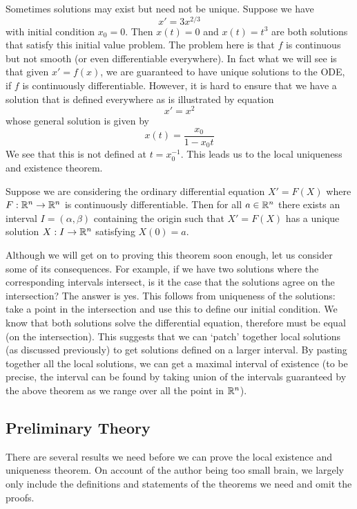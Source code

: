Sometimes solutions may exist but need not be unique. Suppose we have
$$x' = 3x^{2/3}$$
with initial condition $x_0 = 0$. Then $x(t) = 0$ and $x(t) = t^3$ are both solutions that satisfy this initial value problem. The problem here is that $f$ is continuous but not smooth (or even differentiable everywhere). In fact what we will see is that given $x' = f(x)$, we are guaranteed to have unique solutions to the ODE, if $f$ is continuously differentiable. However, it is hard to ensure that we have a solution that is defined everywhere as is illustrated by equation
$$x' = x^2$$
whose general solution is given by
$$x(t) = \frac{x_0}{1 - x_0 t}$$
We see that this is not defined at $t = x_0^{-1}$. This leads us to the local uniqueness and existence theorem.

\begin{theorem}
    Suppose we are considering the ordinary differential equation $X' = F(X)$ where $F: \mathbb{R}^n \to \mathbb{R}^n$ is continuously differentiable. Then for all $a \in \mathbb{R}^n$ there exists an interval $I = (\alpha, \beta)$ containing the origin such that $X' = F(X)$ has a unique solution $X: I \to \mathbb{R}^n$ satisfying $X(0) = a$.
\end{theorem}

Although we will get on to proving this theorem soon enough, let us consider some of its consequences. For example, if we have two solutions where the corresponding intervals intersect, is it the case that the solutions agree on the intersection? The answer is yes. This follows from uniqueness of the solutions: take a point in the intersection and use this to define our initial condition. We know that both solutions solve the differential equation, therefore must be equal (on the intersection). This suggests that we can `patch' together local solutions (as discussed previously) to get solutions defined on a larger interval. By pasting together all the local solutions, we can get a maximal interval of existence (to be precise, the interval can be found by taking union of the intervals guaranteed by the above theorem as we range over all the point in $\mathbb{R}^n$).

\subsection{Preliminary Theory}
There are several results we need before we can prove the local existence and uniqueness theorem. On account of the author being too small brain, we largely only include the definitions and statements of the theorems we need and omit the proofs.

